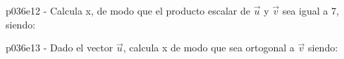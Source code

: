 \documentclass[spanish, 11pt]{exam}
\begin{document}
\begin{questions}
\begin{multicols}{2}
\begin{parts}
        \end{parts}
        \end{multicols}
        \question p036e12 - Calcula x, de modo que el producto escalar
de  $\overrightarrow{u}$ y $\overrightarrow{v}$ sea igual a 7, siendo: 
        \begin{multicols}{2} 
        \end{multicols}
        \question p036e13 - Dado el vector
$\overrightarrow{u}$, calcula x de modo que sea ortogonal a $\overrightarrow{v}$ siendo: 
        \begin{multicols}{2} 

\end{multicols}
\end{questions}
\end{document}
